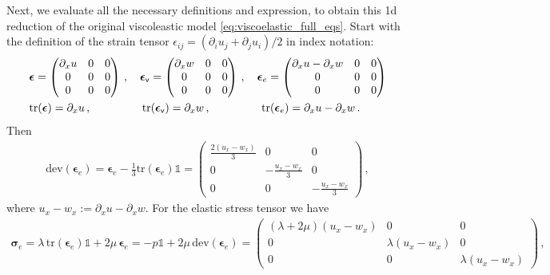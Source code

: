 \documentclass[11pt,a4paper]{article}
\newcommand{\p}{\partial}
\newcommand{\bb}[1]{\boldsymbol{#1}}
\newcommand{\dev}{\text{dev}}
\newcommand{\varv}{\mathsf{v}}
\newcommand{\tr}{\text{tr}}
\begin{document}
Next, we evaluate all the necessary definitions and expression, to obtain this 1d reduction of the original viscoleastic model \eqref{eq:viscoelastic_full_eqs}. Start with the definition of the strain tensor $\epsilon_{ij} = (\p_i u_j + \p_j u_i)/2$ in index notation:
\begin{align*}
    &
    \bb{\epsilon} = 
    \begin{pmatrix}
    \partial_x u & 0 & 0 \\
    0 & 0 & 0 \\
    0 & 0 & 0
    \end{pmatrix}
    \,,
    \quad
    \bb{\epsilon}_\varv = 
    \begin{pmatrix}
    \partial_x w & 0 & 0 \\
    0 & 0 & 0 \\
    0 & 0 & 0
    \end{pmatrix}
    \,,
    \quad
    \bb{\epsilon}_e = 
    \begin{pmatrix}
    \partial_x u - \partial_x w & 0 & 0 \\
    0 & 0 & 0 \\
    0 & 0 & 0
    \end{pmatrix}
    \\
    &
    \tr(\bb{\epsilon}) = \p_x u
    \,,
    \hspace{1.6cm}
    \tr(\bb{\epsilon}_\varv) = \p_x w
    \,,
    \hspace{1.6cm}
    \tr(\bb{\epsilon}_e) = \p_x u - \p_x w
    \,.
\end{align*}
Then
\begin{align*}
    \dev(\bb{\epsilon}_e) = \bb{\epsilon}_e - \frac{1}{3} \tr(\bb{\epsilon}_e) \mathbb{1}
    = 
    \begin{pmatrix}
    \frac{2(u_x-w_x)}{3} & 0 & 0 \\
    0 & -\frac{u_x-w_x}{3} & 0 \\
    0 & 0 & -\frac{u_x-w_x}{3}
    \end{pmatrix}
    \,,
\end{align*}
where $u_x -w_x:= \p_x u - \p_x w$. For the elastic stress tensor we have
\begin{align*}
    \bb{\sigma}_e = \lambda \, \tr(\bb{\epsilon}_e) \mathbb{1}+ 2 \mu \, \bb{\epsilon}_e 
    = - p \mathbb{1} + 2 \mu \, \dev({\bb{\epsilon}_e})
    =
    \begin{pmatrix}
    (\lambda + 2 \mu) (u_x-w_x) & 0 & 0 \\
    0 & \lambda (u_x-w_x) & 0 \\
    0 & 0 & \lambda (u_x-w_x)
    \end{pmatrix}
    \,,
\end{align*}
\end{document}
